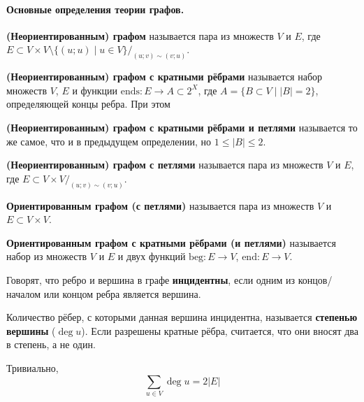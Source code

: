 \documentclass{article}
\begin{document}
    \tableofcontents\pagebreak
    \paragraph{Основные определения теории графов.}
    \begin{definition}
        \textbf{(Неориентированным) графом} называется пара из множеств $V$ и $E$, где $E\subset V\times V\setminus\{(u;u)\mid u\in V\}/_{(u;v)\sim(v;u)}$.
    \end{definition}
    \begin{definition}
        \textbf{(Неориентированным) графом с кратными рёбрами} называется набор множеств $V$, $E$ и функции $\mathrm{ends}\colon E\to A\subset 2^X$, где $A=\{B\subset V\mid |B|=2\}$, определяющей концы ребра. При этом 
    \end{definition}
    \begin{definition}
        \textbf{(Неориентированным) графом с кратными рёбрами и петлями} называется то же самое, что и в предыдущем определении, но $1\leqslant|B|\leqslant2$.
    \end{definition}
    \begin{definition}
        \textbf{(Неориентированным) графом с петлями} называется пара из множеств $V$ и $E$, где $E\subset V\times V/_{(u;v)\sim(v;u)}$.
    \end{definition}
    \begin{definition}
        \textbf{Ориентированным графом (с петлями)} называется пара из множеств $V$ и $E\subset V\times V$.
    \end{definition}
    \begin{definition}
        \textbf{Ориентированным графом с кратными рёбрами (и петлями)} называется набор из множеств $V$ и $E$ и двух функций $\mathrm{beg}\colon E\to V$, $\mathrm{end}\colon E\to V$.
    \end{definition}
    \begin{definition}
        Говорят, что ребро и вершина в графе \textbf{инцидентны}, если одним из концов/началом или концом ребра является вершина.
    \end{definition}
    \begin{definition}
        Количество рёбер, с которыми данная вершина инцидентна, называется \textbf{степенью вершины} ($\deg u$). Если разрешены кратные рёбра, считается, что они вносят два в степень, а не один.
    \end{definition}
    \begin{lemma}
        Тривиально,
        $$
        \sum\limits_{u\in V}\deg u=2|E|
        $$
    \end{lemma}
\end{document}
